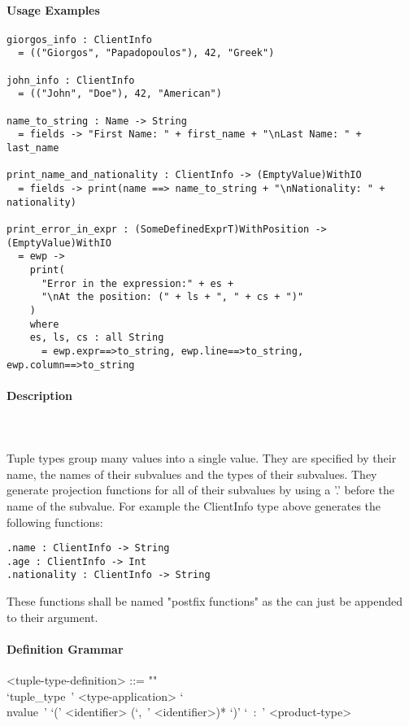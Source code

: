 \documentclass{article}
\def\pend{\mbox{} \\\\}
\begin{document}
\paragraph{Usage Examples}

\begin{verbatim}
giorgos_info : ClientInfo
  = (("Giorgos", "Papadopoulos"), 42, "Greek")

john_info : ClientInfo
  = (("John", "Doe"), 42, "American")

name_to_string : Name -> String
  = fields -> "First Name: " + first_name + "\nLast Name: " + last_name

print_name_and_nationality : ClientInfo -> (EmptyValue)WithIO
  = fields -> print(name ==> name_to_string + "\nNationality: " + nationality)

print_error_in_expr : (SomeDefinedExprT)WithPosition -> (EmptyValue)WithIO
  = ewp ->
    print(
      "Error in the expression:" + es +
      "\nAt the position: (" + ls + ", " + cs + ")"
    )
    where
    es, ls, cs : all String
      = ewp.expr==>to_string, ewp.line==>to_string, ewp.column==>to_string
\end{verbatim}

\paragraph{Description}\pend
Tuple types group many values into a single value. They are specified by their name,
the names of their subvalues and the types of their subvalues. They generate 
projection functions for all of their subvalues by using a '.' before the name of 
the subvalue. For example the ClientInfo type above generates the following 
functions:
\begin{verbatim}
.name : ClientInfo -> String
.age : ClientInfo -> Int
.nationality : ClientInfo -> String
\end{verbatim}
These functions shall be named "postfix functions" as the can just be appended to
their argument.

\paragraph{Definition Grammar}
\begin{grammar}
<tuple-type-definition> ::= ""\\
`tuple_type\ ' <type-application>
`\\nvalue\ ' `(' <identifier> (`,\ ' <identifier>)* `)' `\ :\ ' <product-type>
\end{grammar}
\end{document}
